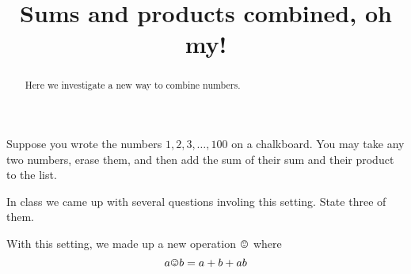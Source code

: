 \documentclass[handout,nooutcomes,space]{ximera}
\title{Sums and products combined, oh my!}
\begin{document}
\begin{abstract}
Here we investigate a new way to combine numbers.
\end{abstract}
\maketitle

Suppose you wrote the numbers $1,2,3,\dots,100$ on a chalkboard. You
may take any two numbers, erase them, and then add the sum of their
sum and their product to the list.

\begin{problem}
In class we came up with several questions involing this setting. State three of them. 
\begin{freeResponse}
\end{freeResponse}
\end{problem}

\begin{problem}
  With this setting, we made up a new operation $\pt$ where
  \[
  a\pt b = a+b + ab
  \]
\end{problem}
\end{document}
